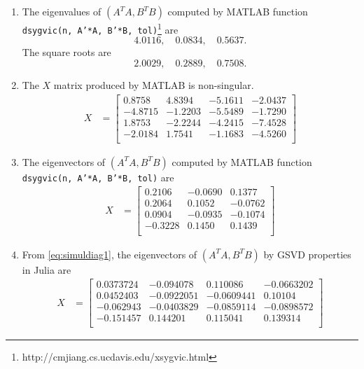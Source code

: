 \begin{example}
{\begin{enumerate}[(1).]
\begin{enumerate}
\item The eigenvalues of $(A^TA, B^T B)$ computed by 
MATLAB function {\tt dsygvic(n, A'*A, B'*B, tol)}\footnote{  
http://cmjiang.cs.ucdavis.edu/xsygvic.html} 
are 
\[
4.0116, \quad
0.0834, \quad 
0.5637.
\]
The square roots are  
\[
2.0029, \quad
0.2889,\quad
0.7508. 
\]
\item The $X$ matrix produced by MATLAB is non-singular.
	\begin{align*}
    X &= \begin{bmatrix}
            0.8758  & 4.8394  & -5.1611 &  -2.0437 \\
   			-4.8715 &  -1.2203 &  -5.5489 & -1.7290 \\
    		1.8753 &  -2.2244 & -4.2415 &  -7.4528 \\
   			-2.0184 &  1.7541 &  -1.1683  & -4.5260 \\
    \end{bmatrix}
	\end{align*} 
	
\item The eigenvectors of $(A^TA, B^T B)$ computed by 
MATLAB function {\tt dsygvic(n, A'*A, B'*B, tol)} are
\begin{align*}
    X &= \begin{bmatrix}
           	0.2106 &  -0.0690 & 0.1377 \\
    		0.2064 &   0.1052 &  -0.0762 \\
    		0.0904 &  -0.0935 &  -0.1074 \\
   			-0.3228 &   0.1450  &  0.1439 \\
    \end{bmatrix}
\end{align*}  
\item From \eqref{eq:simuldiag1}, the eigenvectors of $(A^TA, B^T B)$ by GSVD properties
in Julia are
\begin{align*}
    X &= \begin{bmatrix}
           	0.0373724 & -0.094078  &  0.110086 & -0.0663202 \\
  			0.0452403 & -0.0922051 & -0.0609441 &  0.10104  \\
 			-0.062943 &  -0.0403829 & -0.0859114 & -0.0898572 \\
 			-0.151457 &   0.144201 & 0.115041 & 0.139314 \\
    \end{bmatrix}
\end{align*}  
\end{enumerate} 

\end{enumerate} 

}\end{example} 

